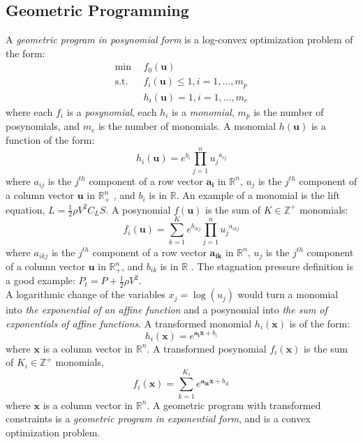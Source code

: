 \subsection{Geometric Programming}

A \emph{geometric program in posynomial form} is a log-convex optimization problem of the form:
\begin{equation}
    \label{GP_standard}
	\begin{split}
 \text{min} &~~f_0 \left(\mathbf{u}\right) \\
 \text{s.t.} &~~f_i \left(\mathbf{u}\right) \leq 1, i = 1,\ldots,m_p \\
 &~~h_i \left(\mathbf{u}\right) = 1, i = 1,\ldots,m_e
\end{split}
\end{equation}
where each $f_i$ is a {\em posynomial}, each $h_i$ is a {\em monomial}, $m_p$ is the number of posynomials,
and $m_e$ is the number of monomials. A monomial $h(\mathbf{u})$ is a function of the form:
\begin{equation}
	h_i(\mathbf{u}) = e^{b_i}\textstyle{\prod}_{j=1}^{n}{u_j}^{a_{ij}}
\end{equation}
where $a_{ij}$ is the $j^{th}$ component of a row vector $\mathbf{a_i}$ in $\mathbb{R}^n$,
$u_j$ is the $j^{th}$ component of a column vector $\mathbf{u}$ in $\mathbb{R}^n_+$ ,
and $b_i$ is in $\mathbb{R}$. An example of a monomial is the lift equation,
$L = \frac{1}{2}\rho V^2 C_L S$. A posynomial $f(\mathbf{u})$ is the sum of $K \in \mathbb{Z}^+$ monomials:
\begin{equation}
	f_i(\mathbf{u}) = \textstyle{\sum_{k=1}^{K}}e^{b_{ikj}}\prod_{j=1}^{n}{u_j}^{a_{ikj}}
\end{equation}
where $a_{ikj}$ is the $j^{th}$ component of a row vector $\mathbf{a_{ik}}$ in $\mathbb{R}^n$,
$u_j$ is the $j^{th}$ component of a column vector $\mathbf{u}$ in $\mathbb{R}^n_+$, and $b_{ik}$
is in $\mathbb{R}$ \cite{Boyd2007}. The stagnation pressure definition is a good example:
$P_t = P + \frac{1}{2} \rho V^2$.\\

A logarithmic change of the variables $x_j = \log(u_j)$ would turn a monomial into
{\em  the exponential of an affine function} and a posynomial into
{\em the sum of exponentials of affine functions}. A transformed monomial $h_i(\mathbf{x})$ is of the form:
\begin{equation}
    h_i(\mathbf{x}) = e^{\mathbf{a_i}\mathbf{x} + b_i}
\end{equation}
where $\mathbf{x}$ is a column vector in $\mathbb{R}^n$.
A transformed posynomial $f_i(\mathbf{x})$ is the sum of $K_i \in \mathbb{Z}^+$ monomials,
\begin{equation}
    f_i(\mathbf{x}) = \textstyle{\sum_{k=1}^{K_i}}e^{\mathbf{a_{ik}}\mathbf{x} + b_{ik}}
\end{equation}
where $\mathbf{x}$ is a column vector in $\mathbb{R}^n$.
A geometric program with transformed constraints is a \emph{geometric program in exponential form}, and
is a convex optimization problem.

